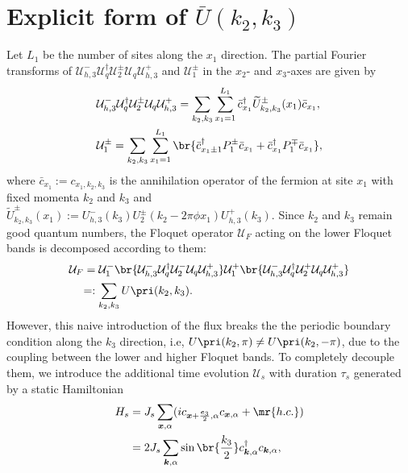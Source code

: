 \documentclass[
floatfix,
pra,
twocolumn,
reprint,
amsmath,amssymb,
aps,
footnote,
]{revtex4}
\begin{document}
\section{\label{sec: explicit}Explicit form of $\bar{U}(k_2, k_3)$}
Let $L_1$ be the number of sites along the $x_1$ direction.
The partial Fourier transforms of $\mathcal{U}_{h,3}^- \mathcal{U}_q^\dagger \mathcal{U}_2^\pm \mathcal{U}_q \mathcal{U}_{h,3}^+$ and $\mathcal{U}_1^{\pm}$ in the $x_2$- and $x_3$-axes are given by
\begin{align}
	&\mathcal{U}_{h,3}^- \mathcal{U}_q^\dagger \mathcal{U}_2^\pm \mathcal{U}_q \mathcal{U}_{h,3}^+
	= \sum_{k_2, k_3} \sum_{x_1=1}^{L_1}
	\bar{c}_{x_1}^\dagger \widetilde{U}_{k_2,k_3}^\pm(x_1) \bar{c}_{x_1}
	, \nonumber \\
	&\mathcal{U}_1^\pm = \sum_{k_2, k_3} \sum_{x_1=1}^{L_1}
	\br{
	\bar{c}_{x_1 \pm 1}^\dagger P_1^\pm \bar{c}_{x_1}
	 + \bar{c}_{x_1}^\dagger P_1^\mp \bar{c}_{x_1}
	}
	,
\end{align}
where $\bar{c}_{x_1} := c_{x_1, k_2, k_3}$ is the annihilation operator of the fermion at site $x_1$ with fixed momenta $k_2$ and $k_3$ and $\widetilde{U}_{k_2,k_3}^\pm(x_1) := U_{h,3}^-(k_3)U_2^\pm(k_2 - 2 \pi \phi x_1)U_{h,3}^+(k_3)$.
Since $k_2$ and $k_3$ remain good quantum numbers, the Floquet operator $\mathcal{U}_F$ acting on the lower Floquet bands is decomposed according to them:
\begin{align}
	& \mathcal{U}_F =
	\mathcal{U}_1^-
	\br{
	\mathcal{U}_{h,3}^- \mathcal{U}_q^\dagger \mathcal{U}_2^- \mathcal{U}_q \mathcal{U}_{h,3}^+
	}
	\mathcal{U}_1^+
	\br{
	\mathcal{U}_{h,3}^- \mathcal{U}_q^\dagger \mathcal{U}_2^+ \mathcal{U}_q \mathcal{U}_{h,3}^+
	}
	\nonumber \\
	&\quad
	=: \sum_{k_2, k_3}U\pri(k_2, k_3)
	.  \label{eq: fcme, 25}
\end{align}
However, this naive introduction of the flux breaks the  the periodic boundary condition along the $k_3$ direction, i.e, $U\pri(k_2, \pi) \ne U\pri(k_2,-\pi)$, due to the coupling between the lower and higher Floquet bands.
To completely decouple them, we introduce the additional time evolution $\mathcal{U}_s$ with duration $\tau_s$ generated by a static Hamiltonian
\begin{align}
	H_s &= J_s \sum_{\bm{x},\alpha} (i c_{\bm{x} + {\bm{e}_3 \over 2},\alpha}c_{\bm{x},\alpha} + \mr{h.c.})
	\nonumber\\
	& = 2J_s\sum_{\bm{k},\alpha} \sin\br{{k_3 \over 2}}
	c_{\bm{k},\alpha}^\dagger c_{\bm{k},\alpha}
	, \label{eq: fcme, 20}
\end{align}
\end{document}
